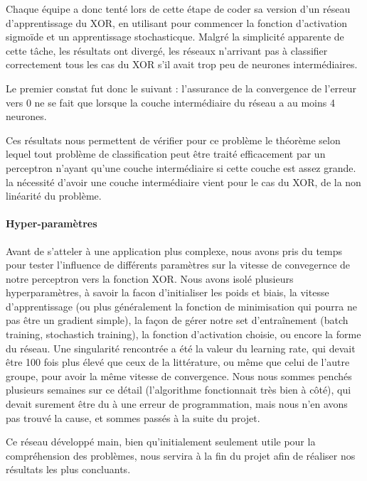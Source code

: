 \documentclass[
    10pt,
    a4paper,
    oneside,
    headinclude,footinclude,
    BCOR=5mm,
    captions=tableabove
]{scrartcl}
\begin{document}
Chaque équipe a donc tenté lors de cette étape de coder sa version d'un réseau d'apprentissage du XOR, en utilisant pour commencer la fonction d'activation sigmoïde et un apprentissage stochasticque. Malgré la simplicité apparente de cette tâche, les résultats ont divergé, les réseaux n'arrivant pas à classifier correctement tous les cas du XOR s'il avait trop peu de neurones intermédiaires.

Le premier constat fut donc le suivant : l'assurance de la convergence de l'erreur vers $0$ ne se fait que lorsque la couche intermédiaire du réseau a au moins 4 neurones.

Ces résultats nous permettent de vérifier pour ce problème le théorème selon lequel tout problème de classification peut être traité efficacement par un perceptron n'ayant qu'une couche intermédiaire si cette couche est assez grande. la nécessité d'avoir une couche intermédiaire vient pour le cas du XOR, de la non linéarité du problème.

\paragraph{Hyper-paramètres}
Avant de s'atteler à une application plus complexe, nous avons pris du temps pour tester l'influence de différents paramètres sur la vitesse de convegernce de notre perceptron vers la fonction XOR. 
Nous avons isolé plusieurs hyperparamètres, à savoir  la facon d'initialiser les poids et biais, la vitesse d'apprentissage (ou plus généralement la fonction de minimisation qui pourra ne pas être un gradient simple), la façon de gérer notre set d'entraînement (batch training, stochastich training), la fonction d'activation choisie, ou encore la forme du réseau.
Une singularité rencontrée a été la valeur du learning rate, qui devait être 100 fois plus élevé que ceux de la littérature, ou même que celui de l'autre groupe, pour avoir la même vitesse de convergence. Nous nous sommes penchés plusieurs semaines sur ce détail (l'algorithme fonctionnait très bien à côté), qui devait surement être du à une erreur de programmation, mais nous n'en avons pas trouvé la cause, et sommes passés à la suite du projet.

Ce réseau développé main, bien qu'initialement seulement utile pour la compréhension des problèmes, nous servira à la fin du projet afin de réaliser nos résultats les plus concluants.
\end{document}

